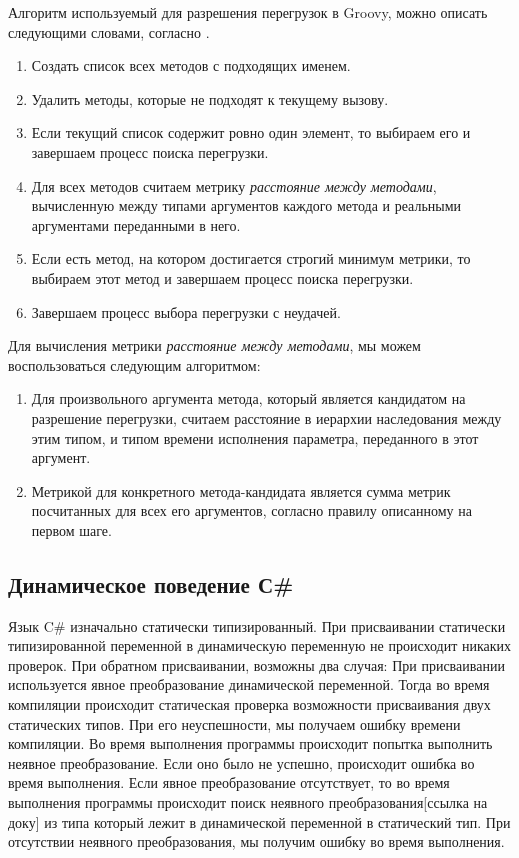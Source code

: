 
Алгоритм используемый для разрешения перегрузок в Groovy, можно описать следующими словами, согласно \cite{groovy:selectingOverloadsAtRuntime}.

\begin{enumerate}
    \item Создать список всех методов с подходящих именем.
    \item Удалить методы, которые не подходят к текущему вызову.
    \item Если текущий список содержит ровно один элемент, то выбираем его и завершаем процесс поиска перегрузки.
    \item Для всех методов считаем метрику \textit{расстояние между методами}, вычисленную между типами аргументов каждого метода и реальными аргументами переданными в него.
    \item Если есть метод, на котором достигается строгий минимум метрики, то выбираем этот метод и завершаем процесс поиска перегрузки.
    \item Завершаем процесс выбора перегрузки с неудачей.
\end{enumerate}

Для вычисления метрики \textit{расстояние между методами}, мы можем воспользоваться следующим алгоритмом:
\begin{enumerate}
    \item Для произвольного аргумента метода, который является кандидатом на разрешение перегрузки, считаем расстояние в иерархии наследования между этим типом, и типом времени исполнения параметра, переданного в этот аргумент.
    \item Метрикой для конкретного метода-кандидата является сумма метрик посчитанных для всех его аргументов, согласно правилу описанному на первом шаге.
\end{enumerate}

\subsection{Динамическое поведение С{\#}}

Язык C\# изначально статически типизированный. При присваивании статически типизированной переменной в динамическую переменную не происходит никаких проверок. При обратном присваивании, возможны два случая:
При присваивании используется  явное преобразование динамической переменной. Тогда во время компиляции происходит статическая проверка возможности присваивания двух статических типов. При его неуспешности, мы получаем ошибку времени компиляции. Во время выполнения программы происходит попытка выполнить неявное преобразование. Если оно было не успешно, происходит ошибка во время выполнения. 
Если явное преобразование отсутствует, то во время выполнения программы происходит поиск неявного преобразования[ссылка на доку] из типа который лежит в динамической переменной в статический тип. При отсутствии неявного преобразования, мы получим ошибку во время выполнения. 

